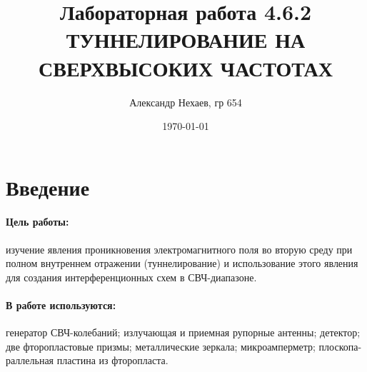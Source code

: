 \documentclass[a4paper, 12pt]{article}
\title{Лабораторная работа 4.6.2\\ТУННЕЛИРОВАНИЕ
НА СВЕРХВЫСОКИХ ЧАСТОТАХ}
\date{\today}
\author{Александр Нехаев, гр 654}
\begin{document}
	\maketitle
	\newpage
	\tableofcontents
	\newpage
	\section{Введение}
	\paragraph{Цель работы:}изучение явления проникновения электромагнитного поля во вторую среду при полном внутреннем отражении (туннелирование) и использование этого явления для создания интерференционных схем в СВЧ-диапазоне.\par
	\paragraph{В работе используются:}генератор СВЧ-колебаний; излучающая и приемная рупорные антенны; детектор; две фторопластовые призмы; металлические зеркала; микроамперметр; плоскопа- раллельная пластина из фторопласта.\par
\end{document}
